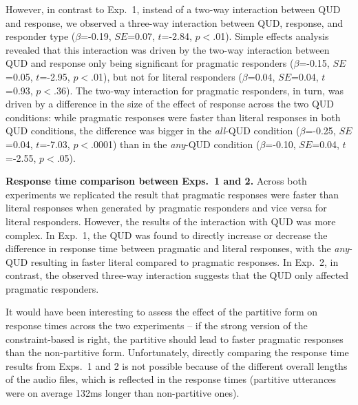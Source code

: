 \documentclass[10pt,letterpaper]{article}
\begin{document}
However, in contrast to Exp.~1, instead of a two-way interaction between QUD and response, we observed a three-way interaction between QUD, response, and responder type ($\beta$=-0.19, $SE$=0.07, $t$=-2.84, $p$$<$.01). Simple effects analysis revealed that this interaction was driven by the two-way interaction between QUD and response only being significant for pragmatic responders ($\beta$=-0.15, $SE$=0.05, $t$=-2.95, $p$$<$.01), but not for literal responders ($\beta$=0.04, $SE$=0.04, $t$=0.93, $p$$<$.36).  The two-way interaction for pragmatic responders, in turn, was driven by a difference in the size of the effect of response across the two QUD conditions: while pragmatic responses were faster than literal responses in both QUD conditions, the difference was bigger in the \emph{all}-QUD condition  ($\beta$=-0.25, $SE$=0.04, $t$=-7.03, $p$$<$.0001) than in the \emph{any}-QUD condition  ($\beta$=-0.10, $SE$=0.04, $t$=-2.55, $p$$<$.05).

\noindent \textbf{Response time comparison between Exps.~1 and 2.} Across both experiments we replicated the result that pragmatic responses were faster than literal responses when generated by pragmatic responders and vice versa for literal responders. However, the results of the interaction with QUD was more complex. In Exp.~1, the QUD was found to directly increase or decrease the difference in response time between pragmatic and literal responses, with the \emph{any}-QUD resulting in faster literal compared to pragmatic responses. In Exp.~2, in contrast, the observed three-way interaction suggests that the QUD only affected pragmatic responders. 


It would have been interesting to assess the effect of the partitive form on response times across the two experiments -- if the strong version of the constraint-based is right, the partitive should lead to faster pragmatic responses than the non-partitive form. Unfortunately, directly comparing the response time results from Exps.~1 and 2 is not  possible because of the different overall lengths of the audio files, which is reflected in the response times (partitive utterances were on average 132ms longer than non-partitive ones).
\end{document}
